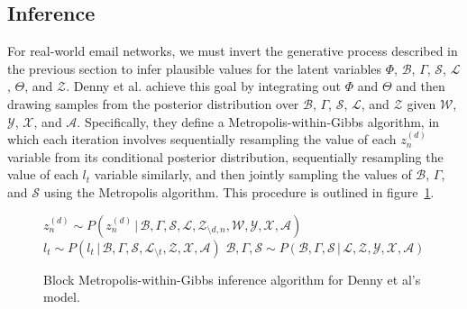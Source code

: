 \documentclass{pnastwo}
\newcommand{\g}{\,|\,}
\begin{document}
\begin{article}


\subsection{Inference}

For real-world email networks, we must invert the generative process
described in the previous section to infer plausible values for the
latent variables $\Phi$, $\mathcal{B}$, $\Gamma$, $\mathcal{S}$,
$\mathcal{L}$, $\Theta$, and $\mathcal{Z}$. Denny et al. achieve this
goal by integrating out $\Phi$ and $\Theta$ and then drawing samples
from the posterior distribution over $\mathcal{B}$, $\Gamma$,
$\mathcal{S}$, $\mathcal{L}$, and $\mathcal{Z}$ given $\mathcal{W}$,
$\mathcal{Y}$, $\mathcal{X}$, and $\mathcal{A}$. Specifically, they
define a Metropolis-within-Gibbs algorithm, in which each iteration
involves sequentially resampling the value of each $z_n^{(d)}$
variable from its conditional posterior distribution, sequentially
resampling the value of each $l_t$ variable similarly, and then
jointly sampling the values of $\mathcal{B}$, $\Gamma$, and
$\mathcal{S}$ using the Metropolis algorithm. This procedure is
outlined in figure~\ref{fig:inference_algorithm}.

\begin{figure}
  \caption{\label{fig:inference_algorithm}Block Metropolis-within-Gibbs inference algorithm for Denny et al's model.}
  
  \begin{algorithmic}[1]
    \State $z^{(d)}_n \sim P(z_n^{(d)} \g
    \mathcal{B},
    \Gamma, \mathcal{S}, \mathcal{L},
    \mathcal{Z}_{\setminus d, n},
    \mathcal{W}, \mathcal{Y}, \mathcal{X},
    \mathcal{A})$
    \EndFor
    \EndFor
    \State $l_t \sim
    P(l_t \g \mathcal{B},
    \Gamma,
    \mathcal{S},
    \mathcal{L}_{\setminus
      t}, \mathcal{Z},
    \mathcal{X},
    \mathcal{A})$
    \EndFor
    \State $\mathcal{B},
    \Gamma,
    \mathcal{S}
    \sim
    P(\mathcal{B},
    \Gamma,
    \mathcal{S}
    \g
    \mathcal{L},
    \mathcal{Z},
    \mathcal{Y},
    \mathcal{X},
    \mathcal{A})$
    \EndFor
  \end{algorithmic}
\end{figure}


\end{article}
\end{document}
